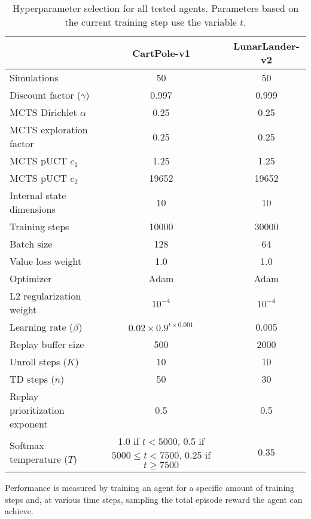 \begin{table}[ht]
    \centering
    \begin{tabular}{|l||c|c|}
        \hline
        & CartPole-v1 & LunarLander-v2 \\
        \hline\hline
        Simulations & 50 & 50 \\
        \hline
        Discount factor ($\gamma$) & 0.997 & 0.999 \\
        \hline
        MCTS Dirichlet $\alpha$ & 0.25 & 0.25 \\
        \hline
        MCTS exploration factor & 0.25 & 0.25 \\
        \hline
        MCTS pUCT $c_1$ & 1.25 & 1.25 \\
        \hline
        MCTS pUCT $c_2$ & 19652 & 19652 \\
        \hline
        Internal state dimensions & 10 & 10 \\
        \hline
        Training steps & 10000 & 30000 \\
        \hline
        Batch size & 128 & 64 \\
        \hline
        Value loss weight & 1.0 & 1.0 \\
        \hline
        Optimizer & Adam & Adam \\
        \hline
        L2 regularization weight & $10^{-4}$ & $10^{-4}$ \\
        \hline
        Learning rate ($\beta$) & $0.02 \times 0.9^{t \times 0.001}$ & 0.005 \\
        \hline
        Replay buffer size & 500 & 2000 \\
        \hline
        Unroll steps ($K$) & 10 & 10 \\
        \hline
        TD steps ($n$) & 50 & 30 \\
        \hline
        Replay prioritization exponent & 0.5 & 0.5 \\
        \hline
        Softmax temperature ($T$) & \makecell{
            1.0 if $t<5000$, \\ 0.5 if $5000 \leq t < 7500$, \\ 0.25 if $t \geq 7500$
        } & 0.35 \\
        \hline
    \end{tabular}
    \caption{Hyperparameter selection for all tested agents. Parameters based on the current training step use the variable $t$.}
    \label{tab:hyperparameters}
\end{table}

 Performance is measured by training an agent for a specific amount of training steps and, at various time steps, sampling the total episode reward the agent can achieve.
